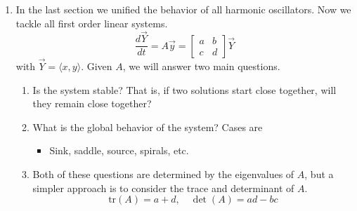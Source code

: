 \documentclass{article}
\begin{document}
\begin{enumerate}

\item In the last section we unified the behavior of all harmonic oscillators. Now we tackle all first order linear systems.
\[
\frac{d\vec{Y}}{dt} = A \vec{y} = \begin{bmatrix}
a & b \\
c & d
\end{bmatrix} \vec{Y}
\]
with $\vec{Y} = \langle x, y \rangle$.
Given $A$, we will answer two main questions.
\begin{enumerate}
\item Is the system stable? That is, if two solutions start close together, will they remain close together?
\item What is the global behavior of the system? Cases are
\begin{itemize}
\item Sink, saddle, source, spirals, etc.
\end{itemize}
\item Both of these questions are determined by the eigenvalues of $A$, but a simpler approach is to consider the trace and determinant of $A$.
\[
\text{tr}(A)= a + d, \quad \det(A) = ad-bc
\]
\end{enumerate}


\end{enumerate}
\end{document}
